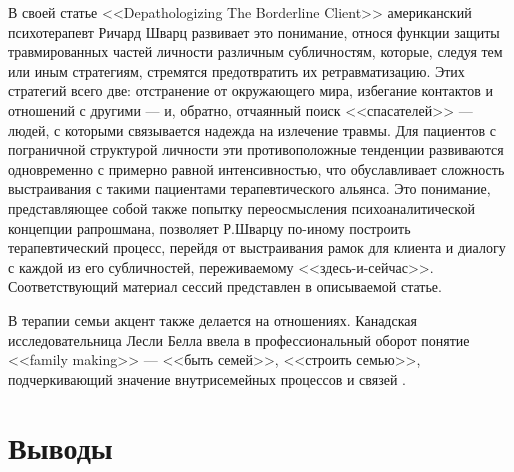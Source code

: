 \documentclass{../../common/thesisbyxetex}
\begin{document}
В своей статье <<Depathologizing The Borderline Client>> \cite{dep} американский 
психотерапевт Ричард Шварц развивает это понимание, относя функции защиты травмированных частей 
личности различным субличностям, которые, следуя тем или иным стратегиям, стремятся предотвратить их 
ретравматизацию. Этих стратегий всего две: отстранение от окружающего мира, избегание контактов и 
отношений с другими --- и, обратно, отчаянный поиск <<спасателей>> --- людей, с которыми связывается 
надежда на излечение травмы. Для пациентов с пограничной структурой личности  эти противоположные 
тенденции развиваются одновременно с примерно равной интенсивностью, что обуславливает сложность 
выстраивания с такими пациентами терапевтического альянса. Это понимание, представляющее собой также 
попытку переосмысления психоаналитической концепции рапрошмана, позволяет Р.Шварцу по-иному 
построить терапевтический процесс, перейдя от выстраивания рамок для клиента и диалогу с каждой из 
его субличностей, переживаемому <<здесь-и-сейчас>>. Соответствующий материал сессий представлен в 
описываемой статье.

В терапии семьи акцент также делается на отношениях. Канадская исследовательница Лесли Белла ввела 
в профессиональный оборот понятие <<family making>> --- <<быть семей>>, <<строить семью>>, 
подчеркивающий значение внутрисемейных процессов и связей \cite{fam}.

\section{Выводы}
\end{document}
